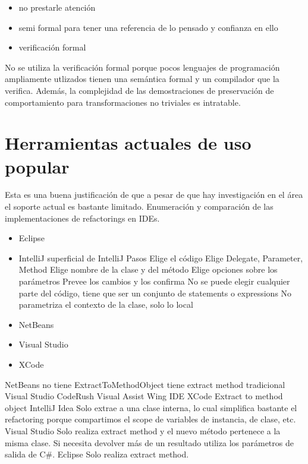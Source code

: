 \begin{itemize}
    \item no prestarle atención
    \item semi formal para tener una referencia de lo pensado y confianza en ello
    \item verificación formal
\end{itemize}

No se utiliza la verificación formal porque pocos lenguajes de programación ampliamente utlizados
tienen una semántica formal y un compilador que la verifica. Además, la complejidad de las
demostraciones de preservación de comportamiento para transformaciones no triviales es intratable.

\section{Herramientas actuales de uso popular}
Esta es una buena justificación de que a pesar de que hay investigación en el área el soporte actual
es bastante limitado.
Enumeración y comparación de  las implementaciones de refactorings en IDEs.

\begin{itemize}
    \item Eclipse
    \item IntelliJ
    superficial de IntelliJ Pasos Elige el código Elige Delegate, Parameter, Method Elige nombre de la
    clase y del método Elige opciones sobre los parámetros Prevee los cambios y los confirma No se puede
    elegir cualquier parte del código, tiene que ser un conjunto de statements o expressions No
    parametriza el contexto de la clase, solo lo local
    \item NetBeans
    \item Visual Studio
    \item XCode
\end{itemize}
 NetBeans no tiene ExtractToMethodObject tiene
extract method tradicional Visual Studio CodeRush Visual Assist Wing IDE XCode Extract to method
object IntelliJ Idea Solo extrae a una clase interna, lo cual simplifica bastante el refactoring
porque compartimos el scope de variables de instancia, de clase, etc. Visual Studio Solo realiza
extract method y el nuevo método pertenece a la misma clase. Si necesita devolver más de un
resultado utiliza los parámetros de salida de C\#. Eclipse Solo realiza extract method.